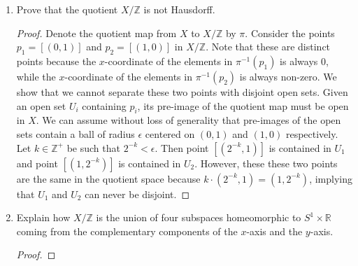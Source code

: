 \documentclass{article}
\begin{document}
\begin{enumerate}
\begin{enumerate}
      \item Prove that the quotient $X/\mathbb{Z}$ is not Hausdorff.
        \begin{proof}
          Denote the quotient map from $X$ to $X/\mathbb{Z}$ by $\pi$.
          Consider the points $p_1=[(0,1)]$ and $p_2=[(1,0)]$ in
          $X/\mathbb{Z}$. Note that these are distinct points because the
          $x$-coordinate of the elements in $\pi^{-1}(p_1)$ is always 0,
          while the $x$-coordinate of the elements in $\pi^{-1}(p_2)$ is
          always non-zero. We show that we cannot separate these two points
          with disjoint open sets. Given an open set $U_i$ containing
          $p_i$, its pre-image of the quotient map must be open in $X$. We
          can assume without loss of generality that pre-images of the open
          sets contain a ball of radius $\epsilon$ centered on $(0,1)$ and
          $(1,0)$ respectively. Let $k\in\mathbb{Z}^+$ be such that
          $2^{-k}<\epsilon$. Then point $[(2^{-k},1)]$ is contained in
          $U_1$ and point $[(1,2^{-k})]$ is contained in $U_2$.
          However, these these two points are the same in the quotient
          space because $k\cdot(2^{-k},1)=(1,2^{-k})$, implying that $U_1$
          and $U_2$ can never be disjoint.
        \end{proof}

      \item Explain how $X/\mathbb{Z}$ is the union of four subspaces
        homeomorphic to $S^1\times\mathbb{R}$ coming from the complementary
        components of the $x$-axis and the $y$-axis.

        \begin{proof}
        \end{proof}
    \end{enumerate}
\end{enumerate}
\end{document}

